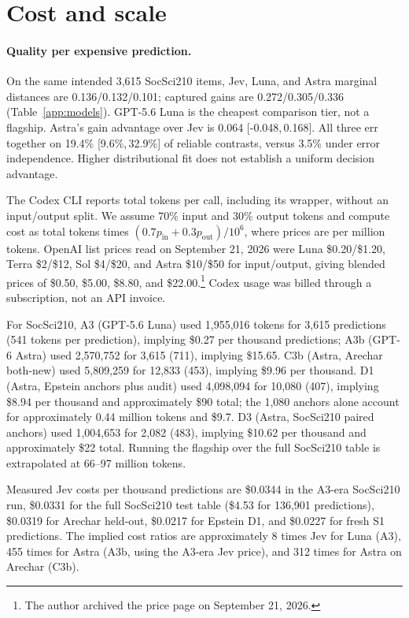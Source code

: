 \documentclass[11pt]{article}
\newcommand{\CI}[2]{[#1,\,#2]}
\begin{document}
\section{Cost and scale}
\paragraph{Quality per expensive prediction.}
On the same intended 3,615 SocSci210 items, Jev, Luna, and Astra marginal distances are 0.136/0.132/0.101; captured gains are 0.272/0.305/0.336 (Table~\ref{app:models}). GPT-5.6 Luna is the cheapest comparison tier, not a flagship. Astra's gain advantage over Jev is 0.064 \CI{-0.048}{0.168}. All three err together on 19.4\% \CI{9.6\%}{32.9\%} of reliable contrasts, versus 3.5\% under error independence. Higher distributional fit does not establish a uniform decision advantage.

The Codex CLI reports total tokens per call, including its wrapper, without an input/output split. We assume 70\% input and 30\% output tokens and compute cost as total tokens times $(0.7p_{\mathrm{in}}+0.3p_{\mathrm{out}})/10^6$, where prices are per million tokens. OpenAI list prices read on September 21, 2026 were Luna \$0.20/\$1.20, Terra \$2/\$12, Sol \$4/\$20, and Astra \$10/\$50 for input/output, giving blended prices of \$0.50, \$5.00, \$8.80, and \$22.00.\footnote{The author archived the price page on September 21, 2026.} Codex usage was billed through a subscription, not an API invoice.

For SocSci210, A3 (GPT-5.6 Luna) used 1,955,016 tokens for 3,615 predictions (541 tokens per prediction), implying \$0.27 per thousand predictions; A3b (GPT-6 Astra) used 2,570,752 for 3,615 (711), implying \$15.65. C3b (Astra, Arechar both-new) used 5,809,259 for 12,833 (453), implying \$9.96 per thousand. D1 (Astra, Epstein anchors plus audit) used 4,098,094 for 10,080 (407), implying \$8.94 per thousand and approximately \$90 total; the 1,080 anchors alone account for approximately 0.44 million tokens and \$9.7. D3 (Astra, SocSci210 paired anchors) used 1,004,653 for 2,082 (483), implying \$10.62 per thousand and approximately \$22 total. Running the flagship over the full SocSci210 table is extrapolated at 66--97 million tokens.

Measured Jev costs per thousand predictions are \$0.0344 in the A3-era SocSci210 run, \$0.0331 for the full SocSci210 test table (\$4.53 for 136,901 predictions), \$0.0319 for Arechar held-out, \$0.0217 for Epstein D1, and \$0.0227 for fresh S1 predictions. The implied cost ratios are approximately 8 times Jev for Luna (A3), 455 times for Astra (A3b, using the A3-era Jev price), and 312 times for Astra on Arechar (C3b).
\end{document}
